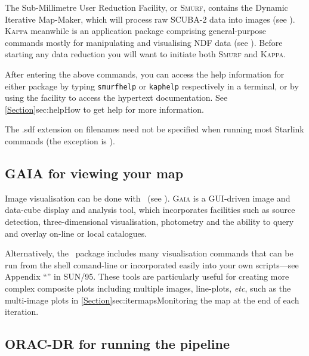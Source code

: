 The Sub-Millimetre User Reduction Facility, or \textsc{Smurf},
contains the Dynamic Iterative Map-Maker, which will process raw
SCUBA-2 data into images (see \smurfsun). \textsc{Kappa} meanwhile is
an application package comprising general-purpose commands mostly for
manipulating and visualising NDF data (see \kappasun). Before starting
any data reduction you will want to initiate both \textsc{Smurf} and
\textsc{Kappa}.

\begin{terminalv}
\end{terminalv}

After entering the above commands, you can access the help information
for either package by typing \texttt{smurfhelp} or
\texttt{kaphelp} respectively in a terminal, or by using the
 facility to access the hypertext documentation. See
\cref{Section}{sec:help}{How to get help} for more information.



\begin{tip}
The .sdf extension on filenames need not be specified when running most
Starlink commands (the exception is \picard).
\end{tip}


\subsection{GAIA for viewing your map}

Image visualisation can be done with \gaia\ (see
\gaiasun). \textsc{Gaia} is a GUI-driven image and data-cube display and
analysis tool, which incorporates facilities such as source detection,
three-dimensional visualisation, photometry and the ability to query
and overlay on-line or local catalogues.
\begin{terminalv}
\end{terminalv}

Alternatively, the \Kappa\ package includes many visualisation commands
that can be run from the shell comand-line or incorporated easily into your
own scripts---see Appendix ``''
in SUN/95. These tools are particularly useful for creating more complex
composite plots including multiple images, line-plots, \emph{etc}, such
as the multi-image plots in \cref{Section}{sec:itermaps}{Monitoring the
map at the end of each iteration}.

\subsection{ORAC-DR for running the pipeline}

